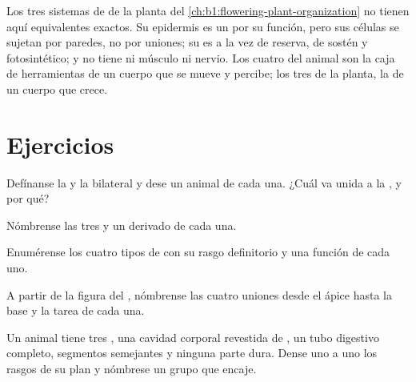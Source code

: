 \begin{remark}\label{rem:b1:body-plans-tissues:plants}
Los tres sistemas de  de la planta del
\cref{ch:b1:flowering-plant-organization} no tienen aquí equivalentes
exactos. Su epidermis es un  por su función, pero sus células se
sujetan por paredes, no por uniones; su  es a la vez de
reserva, de sostén y fotosintético; y no tiene ni músculo ni nervio. Los
cuatro  del animal son la caja de herramientas de un cuerpo que se
mueve y percibe; los tres de la planta, la de un cuerpo que crece.
\end{remark}

\section{Ejercicios}

\begin{exercise}[$\star$]\label{exo:b1:body-plans-tissues:1}
Defínanse la  y la bilateral y dese un animal de cada una.
¿Cuál va unida a la , y por qué?
\end{exercise}

\begin{exercise}[$\star$]\label{exo:b1:body-plans-tissues:2}
Nómbrense las tres  y un  derivado de cada una.
\end{exercise}

\begin{exercise}[$\star$]\label{exo:b1:body-plans-tissues:3}
Enumérense los cuatro tipos de  con su rasgo definitorio y una función
de cada uno.
\end{exercise}

\begin{exercise}[$\star$]\label{exo:b1:body-plans-tissues:4}
A partir de la figura del , nómbrense las cuatro uniones desde el
ápice hasta la base y la tarea de cada una.
\end{exercise}

\begin{exercise}[$\star\star$]\label{exo:b1:body-plans-tissues:5}
Un animal tiene tres , una cavidad corporal revestida de
, un tubo digestivo completo, segmentos semejantes y ninguna parte
dura. Dense uno a uno los rasgos de su plan y nómbrese un grupo que encaje.
\end{exercise}

